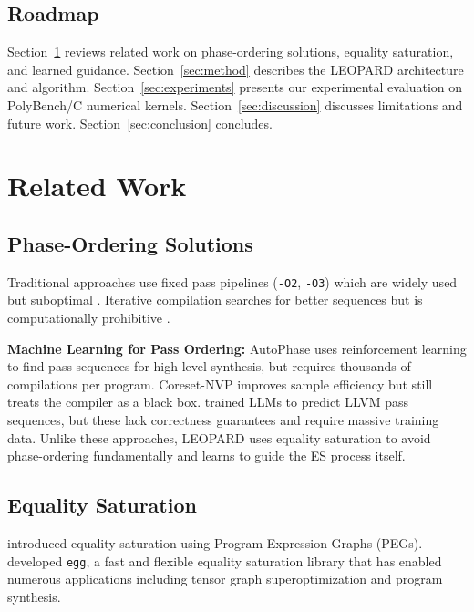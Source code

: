 \documentclass{article}
\begin{document}
\subsection{Roadmap}

Section~\ref{sec:related} reviews related work on phase-ordering solutions, equality saturation, and learned guidance. Section~\ref{sec:method} describes the LEOPARD architecture and algorithm. Section~\ref{sec:experiments} presents our experimental evaluation on PolyBench/C numerical kernels. Section~\ref{sec:discussion} discusses limitations and future work. Section~\ref{sec:conclusion} concludes.

\section{Related Work}
\label{sec:related}

\subsection{Phase-Ordering Solutions}

Traditional approaches use fixed pass pipelines (\texttt{-O2}, \texttt{-O3}) which are widely used but suboptimal \citep{cooper1995compiler}. Iterative compilation searches for better sequences but is computationally prohibitive \citep{almagor2004finding}.

\textbf{Machine Learning for Pass Ordering:} AutoPhase \citep{hajali2020autophase} uses reinforcement learning to find pass sequences for high-level synthesis, but requires thousands of compilations per program. Coreset-NVP \citep{liang2023coreset} improves sample efficiency but still treats the compiler as a black box. \citet{cummins2023llm} trained LLMs to predict LLVM pass sequences, but these lack correctness guarantees and require massive training data. Unlike these approaches, LEOPARD uses equality saturation to avoid phase-ordering fundamentally and learns to guide the ES process itself.

\subsection{Equality Saturation}

\citet{tate2009equality} introduced equality saturation using Program Expression Graphs (PEGs). \citet{willsey2021egg} developed \texttt{egg}, a fast and flexible equality saturation library that has enabled numerous applications including tensor graph superoptimization \citep{wang2021equality} and program synthesis.
\end{document}
